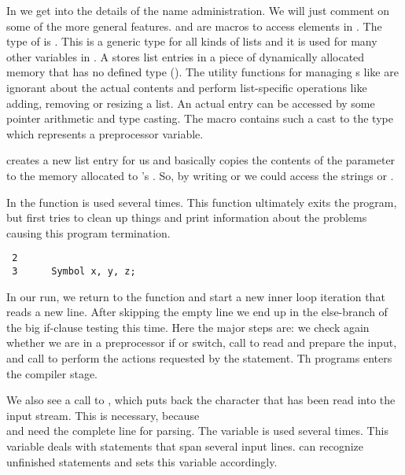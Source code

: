 In  we get into the details of the name administration. We will
just comment on some of the more general features.  and  are
macros to access elements in . The type of  is
. This is a generic type for all kinds of lists and it is used for many
other variables in \FORM. A  stores list entries in a piece of
dynamically allocated memory that has no defined type (). The utility
functions for managing s like  are ignorant about the
actual contents and perform list-specific operations like adding, removing or
resizing a list. An actual entry can be accessed by some pointer arithmetic and
type casting. The  macro contains such a cast to the type 
which represents a preprocessor variable.

 creates a new list entry for us and basically copies the
contents of the parameter  to the memory allocated to 's
. So, by writing  or  we could
access the strings  or .

In  the function  is used several times. This
function ultimately exits the program, but first tries to clean up things and
print information about the problems causing this program termination.

\begin{verbatim}
 2      
 3      Symbol x, y, z;
\end{verbatim}

In our run, we return to the function  and start a new inner
loop iteration that reads a new line. After skipping the empty line we end up
in the else-branch of the big if-clause testing  this time. Here the major
steps are: we check again whether we are in a preprocessor if or switch, call
 to read and prepare the input, and call
 to perform the actions requested by the statement. Th
programs enters the compiler stage.

We also see a call to , which puts back the character that has
been read into the input stream. This is necessary, because \\
 and  need the complete line for
parsing. The variable  is used several times. This variable
deals with statements that span several input lines.  can
recognize unfinished statements and sets this variable accordingly.

